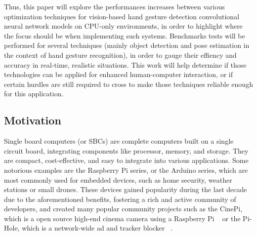 \documentclass[12pt]{article}
\begin{document}
Thus, this paper will explore the performances increases between various optimization techniques for vision-based hand gesture detection convolutional neural network models on CPU-only environments, in order to highlight where the focus should be when implementing such systems. Benchmarks tests will be performed for several techniques (mainly object detection and pose estimation in the context of hand gesture recognition), in order to gauge their effiency and accuracy in real-time, realistic situations. This work will help determine if those technologies can be applied for enhanced human-computer interaction, or if certain hurdles are still required to cross to make those techniques reliable enough for this application.

\subsection{Motivation}

Single board computers (or SBCs) are complete computers built on a single circuit board, integrating components like processor, memory, and storage. They are compact, cost-effective, and easy to integrate into various applications. Some notorious examples are the Raspberry Pi series, or the Arduino series, which are most commonly used for embedded devices, such as home security, weather stations or small drones.
These devices gained popularity during the last decade due to the aforementioned benefits, fostering a rich and active community of developers, and created many popular community projects such as the CinePi, which is a open source high-end cinema camera using a Raspberry Pi ~\cite{CINEPI} or the Pi-Hole, which is a network-wide ad and tracker blocker ~\cite{PIHOLE}.
\end{document}
